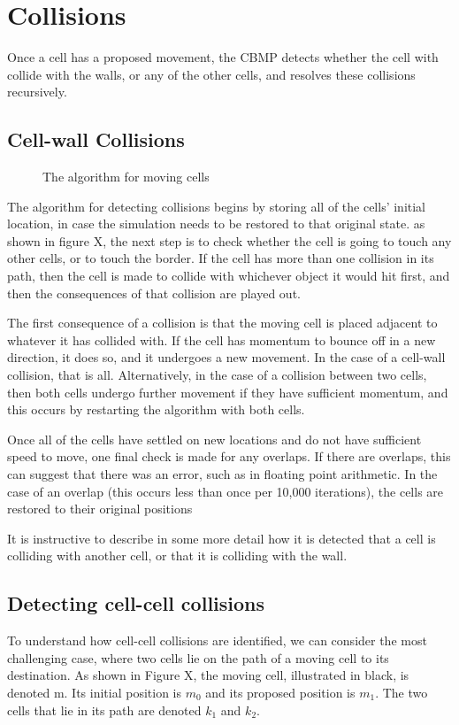 \documentclass[12pt]{article}
\begin{document}
\section{Collisions}
  Once a cell has a proposed movement, the CBMP 
detects whether the cell with collide with the walls, or any of the 
other cells, and resolves these collisions recursively.

\subsection{Cell-wall Collisions}

\begin{figure}[H]
\centering
\caption{The algorithm for moving cells}
\end{figure}

The algorithm for detecting collisions begins by storing all of the 
cells' initial location, in case the simulation needs to be restored to 
that original state. as shown in figure X, the next step is to check 
whether the cell is going to touch any other cells, or to touch the 
border. If the cell has more than one collision in its path, then the 
cell is made to collide with whichever object it would hit first, and 
then the consequences of that collision are played out. 

The first consequence of a collision is that the moving cell is placed 
adjacent to whatever it has collided with. If the cell has momentum to 
bounce off in a new direction, it does so, and it undergoes a new 
movement. In the case of a cell-wall collision, that is all. 
Alternatively, in the case of a collision between two cells, then both 
cells undergo further movement if they have sufficient momentum, and 
this occurs by restarting the algorithm with both cells.

Once all of the cells have settled on new locations and do not have 
sufficient speed to move, one final check is made for any overlaps. If 
there are overlaps, this can suggest that there was an error, such as in 
floating point arithmetic. In the case of an overlap (this occurs less 
than once per 10,000 iterations), the cells are restored to their 
original positions

It is instructive to describe in some more detail how it is detected 
that a cell is colliding with another cell, or that it is colliding with 
the wall.

\subsection{Detecting cell-cell collisions}
To understand how cell-cell collisions are identified, we can consider 
the most challenging case, where two cells lie on the path of a moving 
cell to its destination. As shown in Figure X, the moving cell, 
illustrated in black, is denoted m. Its initial position is \(m_0\) 
and its proposed position is \(m_1\). The two cells that lie in its 
path are denoted \(k_1\) and \(k_2\).
\end{document}
